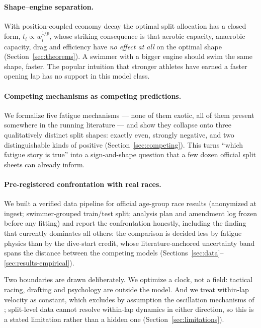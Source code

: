 \paragraph{Shape--engine separation.} With position-coupled economy decay the
optimal split allocation has a closed form, $t_i \propto w_i^{1/p}$, whose
striking consequence is that aerobic capacity, anaerobic capacity, drag and
efficiency have \emph{no effect at all} on the optimal shape
(Section~\ref{sec:theorems}). A swimmer with a bigger engine should swim the
same shape, faster. The popular intuition that stronger athletes have earned
a faster opening lap has no support in this model class.

\paragraph{Competing mechanisms as competing predictions.} We formalize five
fatigue mechanisms --- none of them exotic, all of them present somewhere in
the running literature --- and show they collapse onto three qualitatively
distinct split shapes: exactly even, strongly negative, and two
distinguishable kinds of positive (Section~\ref{sec:competing}). This turns
``which fatigue story is true'' into a sign-and-shape question that a few
dozen official split sheets can already inform.

\paragraph{Pre-registered confrontation with real races.} We built a
verified data pipeline for official age-group race results (anonymized at
ingest; swimmer-grouped train/test split; analysis plan and amendment log
frozen before any fitting) and report the confrontation honestly, including
the finding that currently dominates all others: the comparison is decided
less by fatigue physics than by the dive-start credit, whose
literature-anchored uncertainty band spans the distance between the
competing models (Sections~\ref{sec:data}--\ref{sec:results-empirical}).

Two boundaries are drawn deliberately. We optimize a clock, not a field:
tactical racing, drafting and psychology are outside the model. And we treat
within-lap velocity as constant, which excludes by assumption the
oscillation mechanisms of \citet{aftalionbonnans2014}; split-level data
cannot resolve within-lap dynamics in either direction, so this is a stated
limitation rather than a hidden one (Section~\ref{sec:limitations}).
